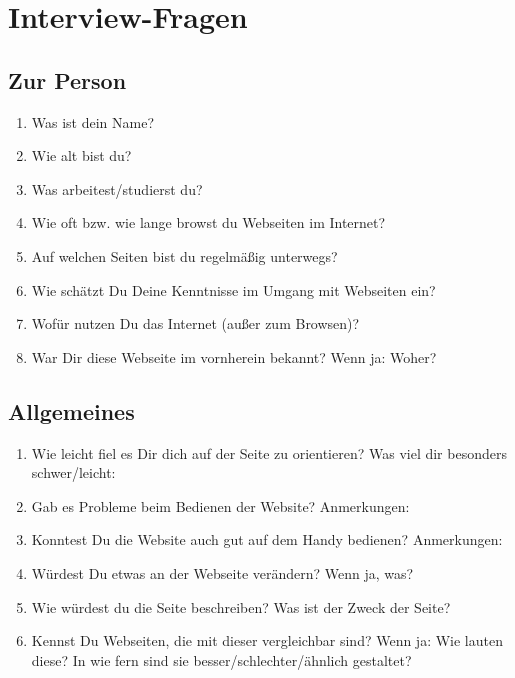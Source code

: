 \section{Interview-Fragen}
\subsection{Zur Person}
\begin{enumerate}
\item Was ist dein Name?
\interviewText{}
\item Wie alt bist du?
\interviewText{}
\item Was arbeitest/studierst du?
\interviewText{}
\item Wie oft bzw. wie lange browst du Webseiten im Internet?
\interviewText{}
\item Auf welchen Seiten bist du regelmäßig unterwegs?
\interviewText{}
\item Wie schätzt Du Deine Kenntnisse im Umgang mit Webseiten ein?
\interviewText{}
\item Wofür nutzen Du das Internet (außer zum Browsen)?
\interviewText{}
\item War Dir diese Webseite im vornherein bekannt? Wenn ja: Woher?
\interviewText{}
\end{enumerate}

\subsection{Allgemeines}
\begin{enumerate}
\item Wie leicht fiel es Dir dich auf der Seite zu orientieren?
Was viel dir besonders schwer/leicht:
\interviewText{\interviewTextM}
\clearpage
\item Gab es Probleme beim Bedienen der Website?
Anmerkungen:
\interviewText{\interviewTextM}
\item Konntest Du die Website auch gut auf dem Handy bedienen?
Anmerkungen:
\interviewText{\interviewTextM}
\item Würdest Du etwas an der Webseite verändern?
Wenn ja, was?
\interviewText{\interviewTextM}
\item Wie würdest du die Seite beschreiben? Was ist der Zweck der Seite?
\interviewText{\interviewTextM}
\clearpage
\item Kennst Du Webseiten, die mit dieser vergleichbar sind? Wenn ja: Wie lauten diese? In wie fern sind sie besser/schlechter/ähnlich gestaltet?
\interviewText{\interviewTextM}
\end{enumerate}

